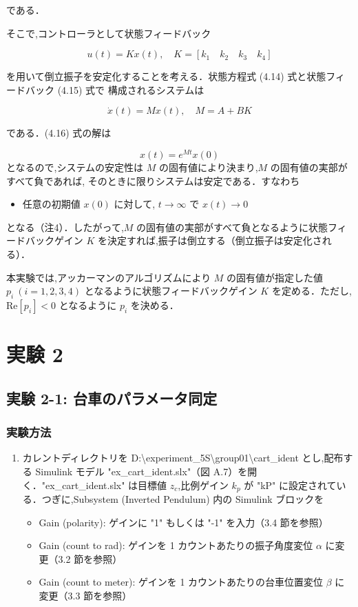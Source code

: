 である．

そこで,コントローラとして状態フィードバック

\[
  u(t) = Kx(t), \quad K = [k_1 \quad k_2 \quad k_3 \quad k_4] \tag{4.15}
\]

を用いて倒立振子を安定化することを考える．状態方程式 (4.14) 式と状態フィードバック (4.15) 式で
構成されるシステムは

\[
  \dot{x}(t) = Mx(t), \quad M = A + BK \tag{4.16}
\]

である．(4.16) 式の解は

\[
  x(t) = e^{Mt}x(0) \tag{4.17}
\]
となるので,システムの安定性は \( M \) の固有値により決まり,\( M \) の固有値の実部がすべて負であれば,
そのときに限りシステムは安定である．すなわち

\begin{itemize}
  \item 任意の初期値 \( x(0) \) に対して, \( t \to \infty \) で \( x(t) \to 0 \)
\end{itemize}

となる（注4）．したがって,\( M \) の固有値の実部がすべて負となるように状態フィードバックゲイン \( K \) 
を決定すれば,振子は倒立する（倒立振子は安定化される）．

本実験では,アッカーマンのアルゴリズムにより \( M \) の固有値が指定した値 \( p_i \ (i=1,2,3,4) \) 
となるように状態フィードバックゲイン \( K \) を定める．ただし,\( \text{Re}[p_i] < 0 \) となるように
\( p_i \) を決める．

\section{実験 2}
\subsection{実験 2-1: 台車のパラメータ同定}
\subsubsection{実験方法}

\begin{enumerate}
  \item カレントディレクトリを D:\textbackslash experiment\_5S\textbackslash group01\textbackslash cart\_ident とし,配布する Simulink モデル "ex\_cart\_ident.slx"（図 A.7）を開く．"ex\_cart\_ident.slx" は目標値 \( z_c \),比例ゲイン \( k_p \) が "kP" に設定されている．つぎに,Subsystem (Inverted Pendulum) 内の Simulink ブロックを
        \begin{itemize}
          \item Gain (polarity): ゲインに "1" もしくは "-1" を入力（3.4 節を参照）
          \item Gain (count to rad): ゲインを 1 カウントあたりの振子角度変位 \( \alpha \) に変更（3.2 節を参照）
          \item Gain (count to meter): ゲインを 1 カウントあたりの台車位置変位 \( \beta \) に変更（3.3 節を参照）
        \end{itemize}
\end{enumerate}

